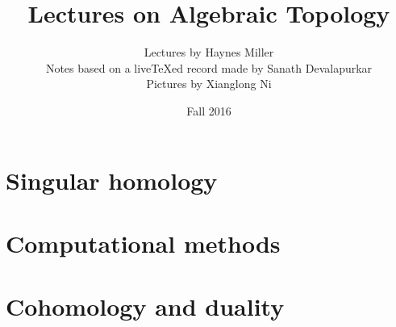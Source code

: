 \documentclass[11pt]{memoir}
\begin{document}
\title{Lectures on Algebraic Topology}
\author{Lectures by Haynes Miller\\

Notes based on a live{\TeX}ed record made by Sanath Devalapurkar\\

Pictures by Xianglong Ni


}
\date{Fall 2016}

\frontmatter

\maketitle

\newpage
\tableofcontents
\newpage

\mainmatter

%

\chapter{Singular homology}














\chapter{Computational methods}













\chapter{Cohomology and duality}













\end{document}
